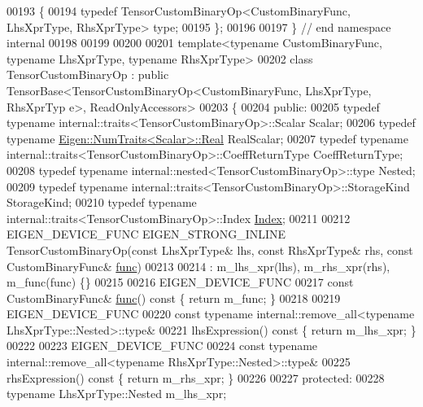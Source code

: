 \begin{DoxyCode}
00193 \{
00194   \textcolor{keyword}{typedef} TensorCustomBinaryOp<CustomBinaryFunc, LhsXprType, RhsXprType> type;
00195 \};
00196 
00197 \}  \textcolor{comment}{// end namespace internal}
00198 
00199 
00200 
00201 \textcolor{keyword}{template}<\textcolor{keyword}{typename} CustomBinaryFunc, \textcolor{keyword}{typename} LhsXprType, \textcolor{keyword}{typename} RhsXprType>
00202 \textcolor{keyword}{class }TensorCustomBinaryOp : \textcolor{keyword}{public} TensorBase<TensorCustomBinaryOp<CustomBinaryFunc, LhsXprType, RhsXprTyp
      e>, ReadOnlyAccessors>
00203 \{
00204   \textcolor{keyword}{public}:
00205   \textcolor{keyword}{typedef} \textcolor{keyword}{typename} internal::traits<TensorCustomBinaryOp>::Scalar Scalar;
00206   \textcolor{keyword}{typedef} \textcolor{keyword}{typename} \hyperlink{group___sparse_core___module}{Eigen::NumTraits<Scalar>::Real} RealScalar;
00207   \textcolor{keyword}{typedef} \textcolor{keyword}{typename} internal::traits<TensorCustomBinaryOp>::CoeffReturnType CoeffReturnType;
00208   \textcolor{keyword}{typedef} \textcolor{keyword}{typename} internal::nested<TensorCustomBinaryOp>::type Nested;
00209   \textcolor{keyword}{typedef} \textcolor{keyword}{typename} internal::traits<TensorCustomBinaryOp>::StorageKind StorageKind;
00210   \textcolor{keyword}{typedef} \textcolor{keyword}{typename} internal::traits<TensorCustomBinaryOp>::Index \hyperlink{namespace_eigen_a62e77e0933482dafde8fe197d9a2cfde}{Index};
00211 
00212   EIGEN\_DEVICE\_FUNC EIGEN\_STRONG\_INLINE TensorCustomBinaryOp(\textcolor{keyword}{const} LhsXprType& lhs, \textcolor{keyword}{const} RhsXprType& rhs, \textcolor{keyword}{
      const} CustomBinaryFunc& \hyperlink{structfunc}{func})
00213 
00214       : m\_lhs\_xpr(lhs), m\_rhs\_xpr(rhs), m\_func(func) \{\}
00215 
00216   EIGEN\_DEVICE\_FUNC
00217   \textcolor{keyword}{const} CustomBinaryFunc& \hyperlink{structfunc}{func}()\textcolor{keyword}{ const }\{ \textcolor{keywordflow}{return} m\_func; \}
00218 
00219   EIGEN\_DEVICE\_FUNC
00220   \textcolor{keyword}{const} \textcolor{keyword}{typename} internal::remove\_all<typename LhsXprType::Nested>::type&
00221   lhsExpression()\textcolor{keyword}{ const }\{ \textcolor{keywordflow}{return} m\_lhs\_xpr; \}
00222 
00223   EIGEN\_DEVICE\_FUNC
00224   \textcolor{keyword}{const} \textcolor{keyword}{typename} internal::remove\_all<typename RhsXprType::Nested>::type&
00225   rhsExpression()\textcolor{keyword}{ const }\{ \textcolor{keywordflow}{return} m\_rhs\_xpr; \}
00226 
00227   \textcolor{keyword}{protected}:
00228     \textcolor{keyword}{typename} LhsXprType::Nested m\_lhs\_xpr;

\end{DoxyCode}
